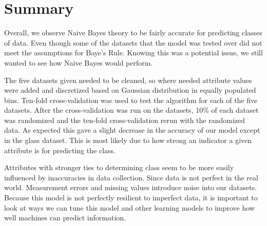 \documentclass[twoside,11pt]{article}
\begin{document}
\section{Summary}

Overall, we observe Naive Bayes theory to be fairly accurate for predicting classes of data. Even though some of the datasets that the model was tested over did not meet the assumptions for Baye's Rule. Knowing this was a potential issue, we still wanted to see how Naive Bayes would perform.  

The five datasets given needed to be cleaned, so where needed attribute values were added and discretized based on Gaussian distribution in equally populated bins. Ten-fold cross-validation was used to test the algorithm for each of the five datasets. After the cross-validation was run on the datasets, 10\% of each dataset was randomized and the ten-fold cross-validation rerun with the randomized data. As expected this gave a slight decrease in the accuracy of our model except in the glass dataset. This is most likely due to how strong an indicator a given attribute is for predicting the class.

Attributes with stronger ties to determining class seem to be more easily influenced by inaccuracies in data collection. Since data is not perfect in the real world. Measurement errors and missing values introduce noise into our datasets. Because this model is not perfectly resilient to imperfect data, it is important to look at ways we can tune this model and other learning models to improve how well machines can predict information.


\nocite{*}
\end{document}
